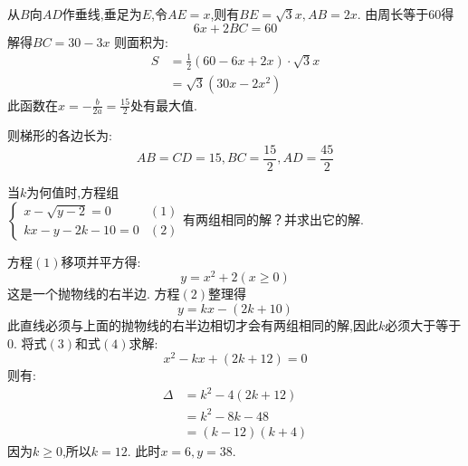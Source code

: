 \begin{questions}
\begin{solution}
\begin{center}
		\end{center}

		从$B$向$AD$作垂线,垂足为$E$,令$AE=x$,则有$BE=\sqrt{3}x, AB=2x$.
		由周长等于$60$得
		\begin{equation*}
			6x + 2BC = 60
		\end{equation*}
		解得$BC = 30 - 3x$
		则面积为:
		\begin{align*}
			S & = \frac12(60-6x + 2x)\cdot\sqrt{3}x \\
			  & = \sqrt{3}(30x - 2x^2)
		\end{align*}
		此函数在$x=-\frac{b}{2a} = \frac{15}{2}$处有最大值.

		则梯形的各边长为:
		\begin{equation*}
			AB = CD = 15, BC = \frac{15}{2}, AD = \frac{45}{2}
		\end{equation*}
	\end{solution}

	\question[10] 当$k$为何值时,方程组 \begin{math}
		\left\{
		\begin{array}{lr}
			x - \sqrt{y - 2} = 0 & (1) \\
			kx - y - 2k - 10 = 0 & (2)
		\end{array}
		\right. 有两组相同的解？并求出它的解.
	\end{math}

	\begin{solution}
		方程$(1)$移项并平方得:
		\begin{equation*}
			y=x^2 + 2 (x \geqslant 0) \tag{3}
		\end{equation*}
		这是一个抛物线的右半边.
		方程$(2)$整理得
		\begin{equation*}
			y=kx - (2k + 10) \tag{4}
		\end{equation*}
		此直线必须与上面的抛物线的右半边相切才会有两组相同的解,因此$k$必须大于等于0.
		将式$(3)$和式$(4)$求解:
		\begin{equation*}
			x^2 - kx + (2k + 12) = 0
		\end{equation*}
		则有:
		\begin{align*}
			\Delta & = k^2 - 4(2k + 12) \\
			       & = k^2 - 8k - 48    \\
			       & = (k-12)(k+4)
		\end{align*}
		因为$k\geqslant 0$,所以$k=12$.
		此时$x=6, y=38$.
	\end{solution}


\end{questions}
